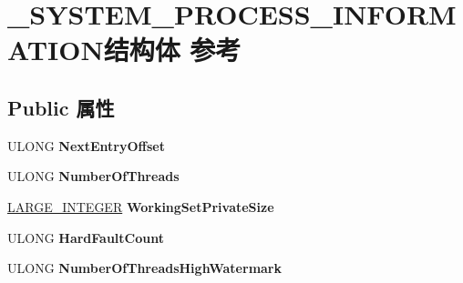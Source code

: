 \hypertarget{struct___s_y_s_t_e_m___p_r_o_c_e_s_s___i_n_f_o_r_m_a_t_i_o_n}{}\section{\+\_\+\+S\+Y\+S\+T\+E\+M\+\_\+\+P\+R\+O\+C\+E\+S\+S\+\_\+\+I\+N\+F\+O\+R\+M\+A\+T\+I\+O\+N结构体 参考}
\label{struct___s_y_s_t_e_m___p_r_o_c_e_s_s___i_n_f_o_r_m_a_t_i_o_n}
\subsection*{Public 属性}
\begin{DoxyCompactItemize}
\item 
\mbox{\label{struct___s_y_s_t_e_m___p_r_o_c_e_s_s___i_n_f_o_r_m_a_t_i_o_n_accc60594e809bb9fe3431634ccb6dba1}} 
U\+L\+O\+NG {\bfseries Next\+Entry\+Offset}
\item 
\mbox{\label{struct___s_y_s_t_e_m___p_r_o_c_e_s_s___i_n_f_o_r_m_a_t_i_o_n_aaacded14f292de0d68d295d5dccc5dba}} 
U\+L\+O\+NG {\bfseries Number\+Of\+Threads}
\item 
\mbox{\label{struct___s_y_s_t_e_m___p_r_o_c_e_s_s___i_n_f_o_r_m_a_t_i_o_n_a2b3e7210bf0815ed8cde140c64a6ca34}} 
\hyperlink{union___l_a_r_g_e___i_n_t_e_g_e_r}{L\+A\+R\+G\+E\+\_\+\+I\+N\+T\+E\+G\+ER} {\bfseries Working\+Set\+Private\+Size}
\item 
\mbox{\label{struct___s_y_s_t_e_m___p_r_o_c_e_s_s___i_n_f_o_r_m_a_t_i_o_n_aca5b5bd64b0661365a11ed069fa7751a}} 
U\+L\+O\+NG {\bfseries Hard\+Fault\+Count}
\item 
\mbox{\label{struct___s_y_s_t_e_m___p_r_o_c_e_s_s___i_n_f_o_r_m_a_t_i_o_n_aacd95f5941013c8519eabd302f7bc3c5}} 
U\+L\+O\+NG {\bfseries Number\+Of\+Threads\+High\+Watermark}
\item 
\mbox{\label{struct___s_y_s_t_e_m___p_r_o_c_e_s_s___i_n_f_o_r_m_a_t_i_o_n_aca566fc5d94432e087135963e7d9334e}} 

\end{DoxyCompactItemize}
